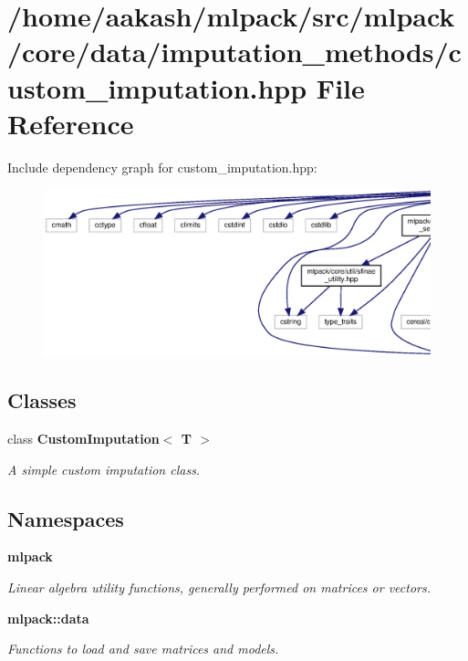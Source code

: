 \section{/home/aakash/mlpack/src/mlpack/core/data/imputation\+\_\+methods/custom\+\_\+imputation.hpp File Reference}
\label{custom__imputation_8hpp}
Include dependency graph for custom\+\_\+imputation.\+hpp\+:
\nopagebreak
\begin{figure}[H]
\begin{center}
\leavevmode
\includegraphics[width=350pt]{custom__imputation_8hpp__incl}
\end{center}
\end{figure}
\subsection*{Classes}
\begin{DoxyCompactItemize}
\item 
class \textbf{ Custom\+Imputation$<$ T $>$}
\begin{DoxyCompactList}\small\item\em A simple custom imputation class. \end{DoxyCompactList}\end{DoxyCompactItemize}
\subsection*{Namespaces}
\begin{DoxyCompactItemize}
\item 
 \textbf{ mlpack}
\begin{DoxyCompactList}\small\item\em Linear algebra utility functions, generally performed on matrices or vectors. \end{DoxyCompactList}\item 
 \textbf{ mlpack\+::data}
\begin{DoxyCompactList}\small\item\em Functions to load and save matrices and models. \end{DoxyCompactList}\end{DoxyCompactItemize}


